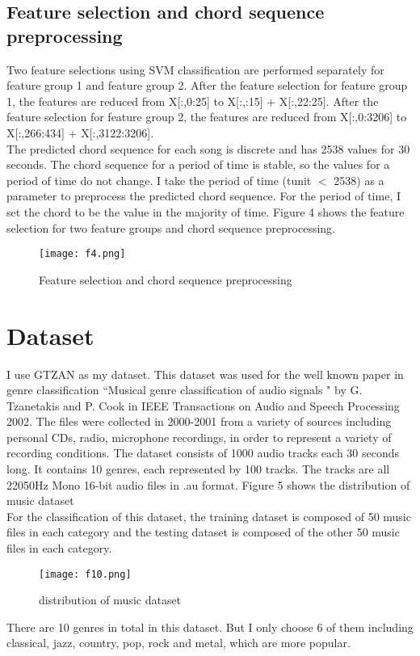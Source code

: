 \documentclass{article} %
\begin{document}
\subsection{Feature selection and chord sequence preprocessing}
Two feature selections using SVM classification are performed separately for feature group 1 and feature group 2.
After the feature selection for feature group 1, the features are reduced from X[:,0:25] to X[:,:15] + X[:,22:25].
After the feature selection for feature group 2, the features are reduced from X[:,0:3206] to X[:,266:434] + X[:,3122:3206]. \\
The predicted chord sequence for each song is discrete and has 2538 values for 30 seconds. The chord sequence for a period of time is stable, so the values for a period of time do not change. I take the period of time (tunit $<$ 2538) as a parameter to preprocess the predicted chord sequence. For the period of time, I set the chord to be the value in the majority of time. Figure 4 shows the feature selection for two feature groups and chord sequence preprocessing.\\
 

\begin{figure}[H]	
	\centering
	\texttt{[image: f4.png]}
	\caption{Feature selection and chord sequence preprocessing}
\end{figure}

\section{Dataset}

I use GTZAN as my dataset. This dataset was used for the well known paper in genre classification ``Musical genre classification of audio signals " by G. Tzanetakis and P. Cook in IEEE Transactions on Audio and Speech Processing 2002. The files were collected in 2000-2001 from a variety of sources including personal CDs, radio, microphone recordings, in order to represent a variety of recording conditions. The dataset consists of 1000 audio tracks each 30 seconds long. It contains 10 genres, each represented by 100 tracks. The tracks are all 22050Hz Mono 16-bit audio files in .au format. Figure 5 shows the distribution of music dataset\\

For the classification of this dataset, the training dataset is composed of 50 music files in each category and the testing dataset is composed of the other 50 music files in each category.
\begin{figure}[H]	
	\centering
	\texttt{[image: f10.png]}
	\caption{distribution of music dataset}
	\end{figure}
There are 10 genres in total in this dataset. But I only choose 6 of them including classical, jazz, country, pop, rock and metal, which are more popular.
\end{document}
